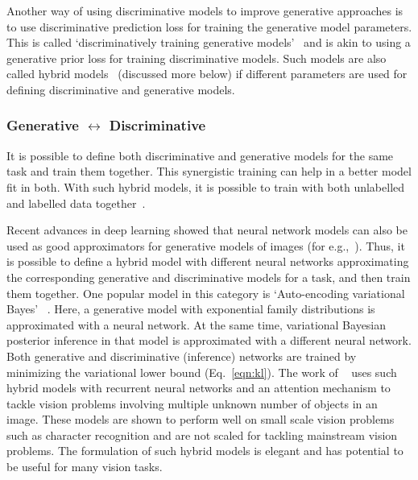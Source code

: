 Another way of using discriminative models to improve
generative approaches is to use discriminative prediction loss for training
the generative model parameters. This is called `discriminatively training
generative models'~\cite{bouchard2004tradeoff,holub2005discriminative,yakhnenko2005discriminatively}
and is akin to using a generative prior loss for training discriminative models.
Such models are also called hybrid models~\cite{lasserre2006principled} (discussed
more below) if different parameters are used for defining discriminative and
generative models.

\subsubsection{Generative $\leftrightarrow $ Discriminative}

It is possible to define both discriminative and generative models for the same
task and train them together. This synergistic training
can help in a better model fit in both. With
such hybrid models, it is possible to  train with both unlabelled and labelled
data together~\cite{lasserre2006principled,minka2005discriminative}.

Recent advances in deep learning showed that neural network models can also be
used as good approximators for generative models of images
(for e.g.,~\cite{dosovitskiy2015learning,gregor2015draw,theis2015generative}). Thus, it is
possible to define a hybrid model with different neural networks approximating
the corresponding generative and discriminative models for a task, and then train them together.
One popular model in this category is `Auto-encoding variational Bayes'
~\cite{kingma2013auto,rezende2014stochastic}. Here,
a generative model with exponential family distributions is approximated with
a neural network. At the same time, variational Bayesian posterior inference in that model is
approximated with a different neural network. Both generative and discriminative
(inference) networks are trained by minimizing the variational lower bound (Eq.~\ref{eqn:kl}).
The work of ~\cite{eslami2016attend} uses such hybrid models with recurrent neural networks
and an attention mechanism to tackle vision problems involving multiple unknown number of objects in an image.
These models are shown to perform well on small scale vision problems such as
character recognition and are not scaled for tackling mainstream vision problems.
The formulation of such hybrid models is elegant and has potential to be useful
for many vision tasks.

